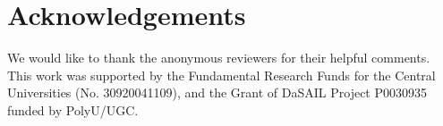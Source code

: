 \documentclass[letterpaper]{article} %
\begin{document}
\section*{Acknowledgements}
We would like to thank the anonymous reviewers for their
helpful comments.
This work was supported by the Fundamental Research Funds for the Central Universities (No. 30920041109),
and the Grant of DaSAIL Project P0030935 funded by PolyU/UGC.
%
%


\end{document}
